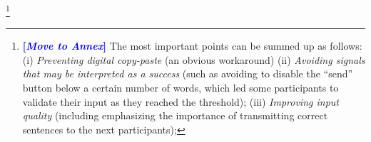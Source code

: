 \documentclass[a4paper,fleqn]{cas-dc}
\newcommand{\tb}[1]{\textcolor{blue}{#1}}
\newcommand{\rk}[1]{\tb{{\footnotesize {\bf[\emph{#1}]}}}}
\begin{document}
\footnote{\rk{Move to Annex} The most important points can be summed up as follows:
(i)
  \emph{Preventing digital copy-paste} (an obvious workaround)
(ii)
  \emph{Avoiding signals that may be interpreted as a success} (such as avoiding to disable the ``send'' button below a certain number of words, which led some participants to validate their input as they reached the threshold);
(iii)
  \emph{Improving input quality} (including emphasizing the importance of transmitting correct sentences to the next participants);
}
\end{document}
